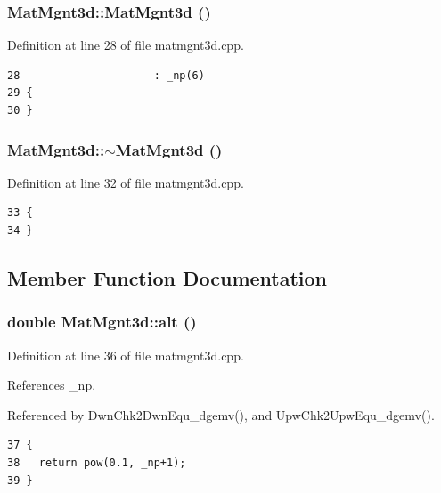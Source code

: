 \subsubsection{\setlength{\rightskip}{0pt plus 5cm}Mat\-Mgnt3d::Mat\-Mgnt3d ()}\label{classMatMgnt3d_f0b4e20a31097a5ff1315875944b0de9_f0b4e20a31097a5ff1315875944b0de9}




Definition at line 28 of file matmgnt3d.cpp.

\footnotesize\begin{verbatim}28                     : _np(6)
29 {
30 }
\end{verbatim}\normalsize 


\subsubsection{\setlength{\rightskip}{0pt plus 5cm}Mat\-Mgnt3d::$\sim$Mat\-Mgnt3d ()}\label{classMatMgnt3d_f6b631909bd602076d7b4dcbc5b9a8c4_f6b631909bd602076d7b4dcbc5b9a8c4}




Definition at line 32 of file matmgnt3d.cpp.

\footnotesize\begin{verbatim}33 {
34 }
\end{verbatim}\normalsize 




\subsection{Member Function Documentation}
\subsubsection{\setlength{\rightskip}{0pt plus 5cm}double Mat\-Mgnt3d::alt ()}\label{classMatMgnt3d_d3e453769e9e986f45d4fce5f3f4b9ad_d3e453769e9e986f45d4fce5f3f4b9ad}




Definition at line 36 of file matmgnt3d.cpp.

References \_\-np.

Referenced by Dwn\-Chk2Dwn\-Equ\_\-dgemv(), and Upw\-Chk2Upw\-Equ\_\-dgemv().

\footnotesize\begin{verbatim}37 {
38   return pow(0.1, _np+1);
39 }
\end{verbatim}\normalsize 



